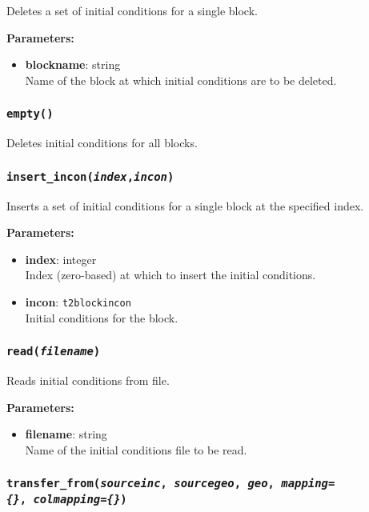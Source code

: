 Deletes a set of initial conditions for a single block.

\textbf{Parameters:}
\begin{itemize}
\item \textbf{blockname}: string\\
  Name of the block at which initial conditions are to be deleted.
\end{itemize}

\subsubsection{\texttt{empty()}}

Deletes initial conditions for all blocks.

\subsubsection{\texttt{insert\_incon(\emph{index},\emph{incon})}}

Inserts a set of initial conditions for a single block at the specified index.

\textbf{Parameters:}
\begin{itemize}
\item \textbf{index}: integer\\
  Index (zero-based) at which to insert the initial conditions.
\item \textbf{incon}: \texttt{t2blockincon}\\
  Initial conditions for the block.
\end{itemize}

\subsubsection{\texttt{read(\emph{filename})}}

Reads initial conditions from file.

\textbf{Parameters:}
\begin{itemize}
\item \textbf{filename}: string\\
  Name of the initial conditions file to be read.
\end{itemize}

\subsubsection{\texttt{transfer\_from(\emph{sourceinc}, \emph{sourcegeo}, \emph{geo}, \emph{mapping=\{\}},\
    \emph{colmapping=\{\}})}}

